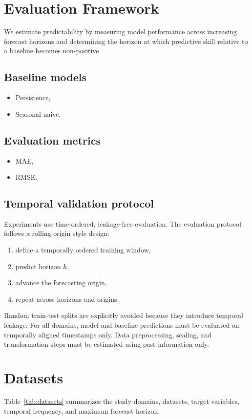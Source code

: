 \documentclass[11pt]{article}
\begin{document}
\section{Evaluation Framework}
We estimate predictability by measuring model performance across increasing forecast horizons and determining the horizon at which predictive skill relative to a baseline becomes non-positive.

\subsection{Baseline models}
\begin{itemize}
  \item Persistence,
  \item Seasonal naive.
\end{itemize}

\subsection{Evaluation metrics}
\begin{itemize}
  \item MAE,
  \item RMSE.
\end{itemize}

\subsection{Temporal validation protocol}
Experiments use time-ordered, leakage-free evaluation. The evaluation protocol follows a rolling-origin style design:
\begin{enumerate}
  \item define a temporally ordered training window,
  \item predict horizon $h$,
  \item advance the forecasting origin,
  \item repeat across horizons and origins.
\end{enumerate}
Random train-test splits are explicitly avoided because they introduce temporal leakage.
For all domains, model and baseline predictions must be evaluated on temporally aligned timestamps only.
Data preprocessing, scaling, and transformation steps must be estimated using past information only.

\section{Datasets}
Table~\ref{tab:datasets} summarizes the study domains, datasets, target variables, temporal frequency, and maximum forecast horizon.
\end{document}
